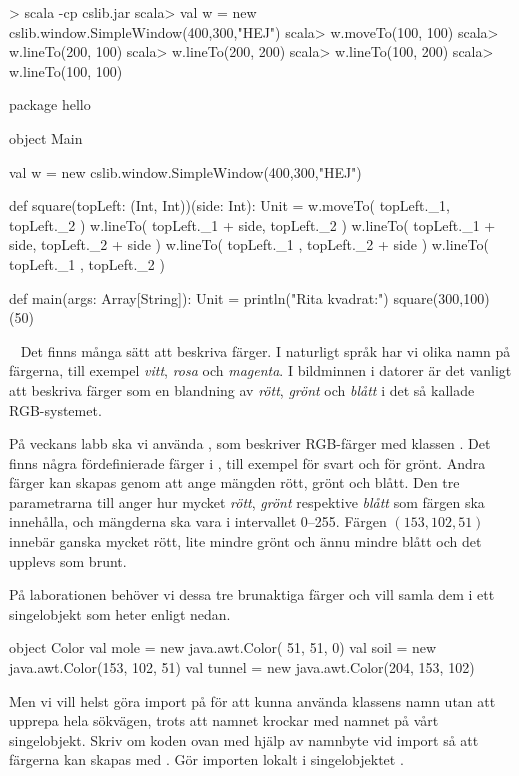 \SubtaskSolved
\begin{REPL}
> scala -cp cslib.jar
scala> val w = new cslib.window.SimpleWindow(400,300,"HEJ")
scala> w.moveTo(100, 100)
scala> w.lineTo(200, 100)
scala> w.lineTo(200, 200)
scala> w.lineTo(100, 200)
scala> w.lineTo(100, 100)
\end{REPL}

\SubtaskSolved
\begin{Code}
package hello

object Main {
  val w = new cslib.window.SimpleWindow(400,300,"HEJ")

  def square(topLeft: (Int, Int))(side: Int): Unit = {
    w.moveTo( topLeft._1,        topLeft._2        )
    w.lineTo( topLeft._1 + side, topLeft._2        )
    w.lineTo( topLeft._1 + side, topLeft._2 + side )
    w.lineTo( topLeft._1       , topLeft._2 + side )
    w.lineTo( topLeft._1       , topLeft._2        )
  }

  def main(args: Array[String]): Unit = {
    println("Rita kvadrat:")
    square(300,100)(50)
  }
}
\end{Code}


\QUESTEND







\QUESTBEGIN

\Task \what~ Det finns många sätt att beskriva färger.
I naturligt språk har vi olika namn på färgerna, till exempel \emph{vitt}, \emph{rosa} och \emph{magenta}.
I bildminnen i datorer är det vanligt att beskriva färger som en blandning av \emph{rött}, \emph{grönt} och \emph{blått} i det så kallade RGB-systemet.

På veckans labb ska vi använda , som beskriver RGB-färger med klassen .
Det finns några fördefinierade färger i , till exempel  för svart och  för grönt.
Andra färger kan skapas genom att ange mängden rött, grönt och blått.
Den tre parametrarna till  anger hur mycket \emph{rött}, \emph{grönt} respektive \emph{blått} som färgen ska innehålla, och mängderna ska vara i intervallet 0--255.
Färgen $(153, 102, 51)$ innebär ganska mycket rött, lite mindre grönt och ännu mindre blått och det upplevs som brunt.


\Subtask
På laborationen behöver vi dessa tre brunaktiga färger och vill samla dem i ett singelobjekt som heter  enligt nedan.
\begin{Code}
object Color {
  val mole   = new java.awt.Color( 51,  51,   0)
  val soil   = new java.awt.Color(153, 102,  51)
  val tunnel = new java.awt.Color(204, 153, 102)
}
\end{Code}
\noindent Men vi vill helst göra import på  för att kunna använda klassens namn utan att upprepa hela sökvägen, trots att namnet krockar med namnet på vårt singelobjekt. Skriv om koden ovan med hjälp av namnbyte vid import så att färgerna kan skapas med . Gör importen lokalt i singelobjektet .



